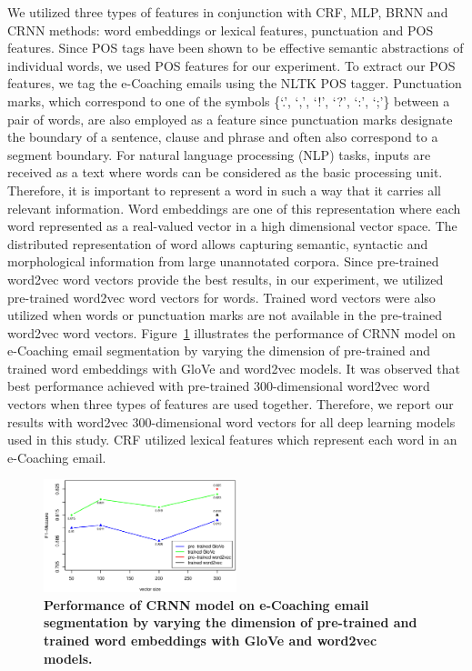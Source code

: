 \documentclass{amia}
\begin{document}
We utilized three types of features in conjunction with CRF, MLP, BRNN and CRNN methods: word embeddings or lexical features, punctuation and POS features. Since POS tags have been shown to be effective semantic abstractions of individual words, we used POS features for our experiment.\cite{liu2005using,treviso2017sentence} To extract our POS features, we tag the e-Coaching emails using the NLTK POS tagger. Punctuation marks, which correspond to one of the symbols \{`.', `,', `!', `?', `:', `;'\} between a pair of words, are also employed as a feature since punctuation marks designate the boundary of a sentence, clause and phrase and often also correspond to a segment boundary. For natural language processing (NLP) tasks, inputs are received as a text where words can be considered as the basic processing unit. Therefore, it is important to represent a word in such a way that it carries all relevant information. Word embeddings are one of this representation where each word represented as a real-valued vector in a high dimensional vector space. The distributed representation of word allows capturing semantic, syntactic and morphological information from large unannotated corpora.\cite{pennington2014glove, mikolov2013distributed} Since pre-trained word2vec word vectors provide the best results, in our experiment, we utilized pre-trained word2vec word vectors for words. Trained word vectors were also utilized when words or punctuation marks are not available in the pre-trained word2vec word vectors. Figure~\ref{fig:embedding-dimension} illustrates the performance of CRNN model on e-Coaching email segmentation by varying the dimension of pre-trained and trained word embeddings with GloVe and word2vec models. It was observed that best performance achieved with pre-trained 300-dimensional word2vec word vectors when three types of features are used together. Therefore, we report our results with word2vec 300-dimensional word vectors for all deep learning models used in this study. CRF utilized lexical features which represent each word in an e-Coaching email. 

\begin{figure}[!htb]
    \centering
    \includegraphics[width=0.5\textwidth]{figures/embedding-dimension.eps}
    \caption{\textbf{Performance of CRNN model on e-Coaching email segmentation by varying the dimension of pre-trained and trained word embeddings with GloVe and word2vec models.}}
    \label{fig:embedding-dimension}
\end{figure}   
\end{document}
